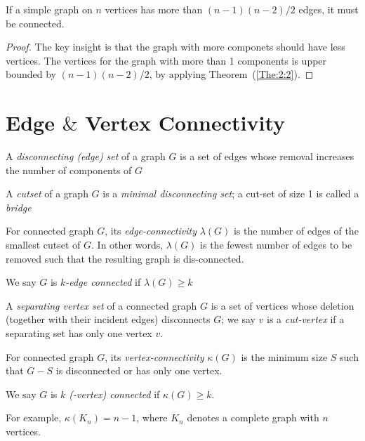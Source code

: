 \begin{corollary}
If a simple graph on $n$ vertices has more than $(n-1)(n-2)/2$ edges, it must be connected.
\end{corollary}
\begin{proof}
The key insight is that the graph with more componets should have less vertices. The vertices for the graph with more than 1 components is upper bounded by $(n-1)(n-2)/2$, by applying Theorem~(\ref{The:2:2}).
\end{proof}
\section{Edge $\&$ Vertex Connectivity}
\begin{definition}
A \emph{disconnecting (edge) set} of a graph $G$ is a set of edges whose removal increases the number of components of $G$
\end{definition}
\begin{definition}[Cutset]
A \emph{cutset} of a graph $G$ is a \emph{minimal disconnecting set};
a cut-set of size 1 is called a \emph{bridge}
\end{definition}
\begin{definition}
For connected graph $G$, its \emph{edge-connectivity} $\lambda(G)$ is the number of edges of the smallest cutset of $G$. 
In other words, $\lambda(G)$ is the fewest number of edges to be removed such that the resulting graph is dis-connected.

We say $G$ is \emph{$k$-edge connected} if $\lambda(G)\ge k$
\end{definition}
\begin{definition}
A \emph{separating vertex set} of a connected graph $G$ is a set of vertices whose deletion (together with their incident edges) disconnects $G$;
we say $v$ is a \emph{cut-vertex} if a separating set has only one vertex $v$.
\end{definition}

\begin{definition}
For connected graph $G$, its \emph{vertex-connectivity} $\kappa(G)$ is the minimum size $S$ such that $G-S$ is disconnected or has only one vertex.

We say $G$ is \emph{$k$ (-vertex) connected} if $\kappa(G)\ge k$.
\end{definition}
For example, $\kappa(K_n) = n-1$, where $K_n$ denotes a complete graph with $n$ vertices.

